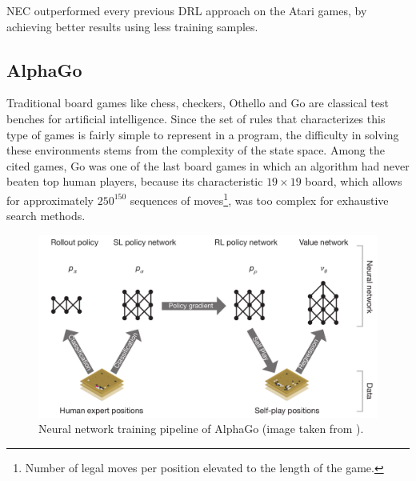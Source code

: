 NEC outperformed every previous DRL approach on the Atari games, by achieving 
better results using less training samples.

\subsection{AlphaGo} \label{s:alphago}
Traditional board games like chess, checkers, Othello and Go are classical 
test benches for artificial intelligence. Since the set of rules that
characterizes this type of games is fairly simple to represent in a program, the
difficulty in solving these environments stems from the complexity of the 
state space. Among the cited games, Go was one of the last board games in which 
an algorithm had never beaten top human players, because its characteristic 
$19 \times 19$ board, which allows for approximately $250^{150}$ sequences of
moves\footnote{Number of legal moves per position elevated to the length of the 
game.}, was too complex for exhaustive search methods.
%
\begin{figure}
    \includegraphics[width=\textwidth]{pictures/alphago}
    \centering
    \caption[Neural network training pipeline of AlphaGo]{Neural network 
	    training pipeline of AlphaGo (image taken from \cite{silver2016mastering}).}
    \label{f:alphago}
\end{figure}
%

